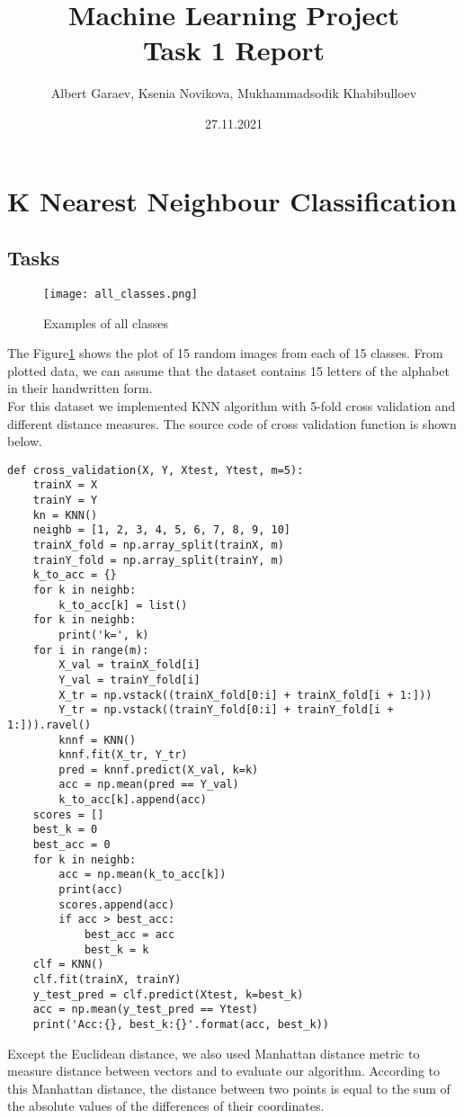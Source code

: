 \documentclass[a4paper, twoside, english]{article}
\title{Machine Learning Project\\Task 1 Report}  %
\author{Albert Garaev, Ksenia Novikova, Mukhammadsodik Khabibulloev }    %
\date{27.11.2021}                              %
\begin{document}
\maketitle


\section{K Nearest Neighbour Classification}
\subsection{Tasks}

\begin{figure}[h!]
	\centerline{\texttt{[image: all\_classes.png]}}
	\caption[classes]{Examples of all classes}
	\label{fig:classes_ex}
\end{figure}

The Figure\ref{fig:classes_ex} shows the plot of 15 random images from each of 15 classes. From plotted data, we can assume that the dataset contains 15 letters of the alphabet in their handwritten form.\\


For this dataset we implemented KNN algorithm with 5-fold cross validation and different distance measures. The source code of cross validation function is shown below.\\

\newpage
\begin{lstlisting}[language=iPython]
def cross_validation(X, Y, Xtest, Ytest, m=5):
	trainX = X
	trainY = Y
	kn = KNN()
	neighb = [1, 2, 3, 4, 5, 6, 7, 8, 9, 10]
	trainX_fold = np.array_split(trainX, m)
	trainY_fold = np.array_split(trainY, m)
	k_to_acc = {}
	for k in neighb:
		k_to_acc[k] = list()
	for k in neighb:
		print('k=', k)
	for i in range(m):
		X_val = trainX_fold[i]
		Y_val = trainY_fold[i]
		X_tr = np.vstack((trainX_fold[0:i] + trainX_fold[i + 1:]))
		Y_tr = np.vstack((trainY_fold[0:i] + trainY_fold[i + 1:])).ravel()
		knnf = KNN()
		knnf.fit(X_tr, Y_tr)
		pred = knnf.predict(X_val, k=k)
		acc = np.mean(pred == Y_val)
		k_to_acc[k].append(acc)
	scores = []
	best_k = 0
	best_acc = 0
	for k in neighb:
		acc = np.mean(k_to_acc[k])
		print(acc)
		scores.append(acc)
		if acc > best_acc:
			best_acc = acc
			best_k = k
	clf = KNN()
	clf.fit(trainX, trainY)
	y_test_pred = clf.predict(Xtest, k=best_k)
	acc = np.mean(y_test_pred == Ytest)
	print('Acc:{}, best_k:{}'.format(acc, best_k))			
\end{lstlisting}
Except the Euclidean distance, we also used Manhattan distance metric to measure distance between vectors and to evaluate our algorithm. According to this Manhattan distance, the distance between two points is equal to the sum of the absolute values of the differences of their coordinates.\\
\end{document}

